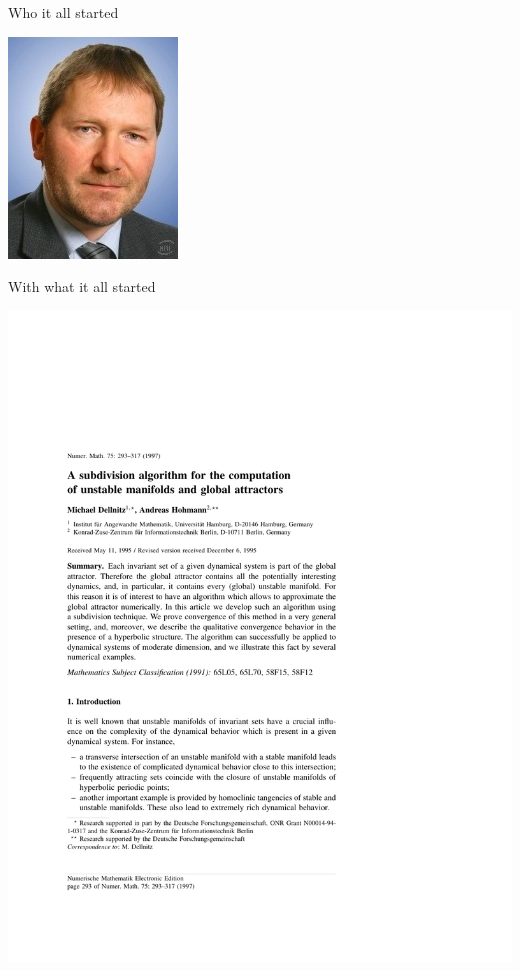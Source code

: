 \documentclass[]{beamer}
\begin{document}
\begin{frame}{Who it all started}

\begin{center}
    \includegraphics[height=0.8\textheight]{figures/dellnitz-2011}
\end{center}

\end{frame}


\begin{frame}{With what it all started}

\includegraphics[trim=0 0 0 160,clip,width=1.3\textwidth]{figures/DH97}

\end{frame}
\end{document}

